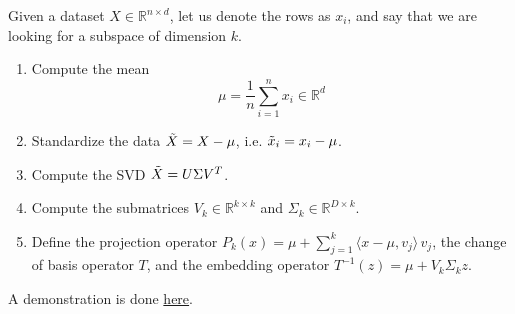   \begin{algo} 
    Given a dataset $X \in \mathbb{R}^{n \times d}$, let us denote the rows as $x_i$, and say that we are looking for a subspace of dimension $k$. 
    \begin{enumerate}
      \item Compute the mean 
      \begin{equation}
        \mu = \frac{1}{n} \sum_{i=1}^n x_i  \in \mathbb{R}^d
      \end{equation} 

      \item Standardize the data $\Tilde{X} = X - \mu$, i.e. $\Tilde{x}_i = x_i - \mu$.  

      \item Compute the SVD $\Tilde{X} = U \Sigma V^T$.

      \item Compute the submatrices $V_k \in \mathbb{R}^{k \times k}$ and $\Sigma_k \in \mathbb{R}^{D \times k}$. 

      \item Define the projection operator $P_k (x) = \mu + \sum_{j=1}^k \langle x - \mu, v_j \rangle \, v_j$, the change of basis operator $T$, and the embedding operator $T^{-1} (z) = \mu + V_k \Sigma_k z$. 
    \end{enumerate} 
    A demonstration is done \href{code/pca.html}{here}.
  \end{algo}

